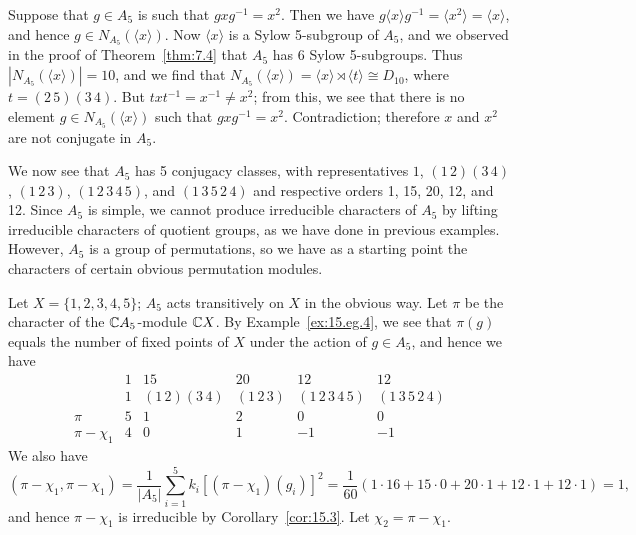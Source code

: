 \documentclass[../Odyssey_Project.tex]{subfiles}
\begin{document}
\begin{example}
Suppose that $g \in A_5$ is such that $gxg^{-1} = x^2$. Then we have $g\langle x \rangle g^{-1} = \langle x^2 \rangle = \langle x \rangle$, and hence $g \in N_{A_5}(\langle x \rangle)$. Now $\langle x \rangle$ is a Sylow 5-subgroup of $A_5$, and we observed in the proof of Theorem~\ref{thm:7.4} that $A_5$ has 6 Sylow 5-subgroups. Thus $|N_{A_5}(\langle x \rangle)| = 10$, and we find that $N_{A_5}(\langle x \rangle) = \langle x \rangle \rtimes \langle t \rangle \cong D_{10}$, where $t = (2\,5)(3\,4)$. But $txt^{-1} = x^{-1} \neq x^2$; from this, we see that there is no element $g \in N_{A_5}(\langle x \rangle)$ such that $gxg^{-1} = x^2$. Contradiction; therefore $x$ and $x^2$ are not conjugate in $A_5$.

We now see that $A_5$ has 5 conjugacy classes, with representatives $1$, $(1\,2)(3\,4)$, $(1\,2\,3)$, $(1\,2\,3\,4\,5)$, and $(1\,3\,5\,2\,4)$ and respective orders 1, 15, 20, 12, and 12. Since $A_5$ is simple, we cannot produce irreducible characters of $A_5$ by lifting irreducible characters of quotient groups, as we have done in previous examples. However, $A_5$ is a group of permutations, so we have as a starting point the characters of certain obvious permutation modules.

Let $X = \{1, 2, 3, 4, 5\}$; $A_5$ acts transitively on $X$ in the obvious way. Let $\pi$ be the character of the $\mathbb{C} A_5$-module $\mathbb{C} X$. By Example~\ref{ex:15.eg.4}, we see that $\pi(g)$ equals the number of fixed points of $X$ under the action of $g \in A_5$, and hence we have
\[
    \begin{array}{c|ccccc}
        & 1 & 15 & 20 & 12 & 12 \\
        & 1 & (1\,2)(3\,4) & (1\,2\,3) & (1\,2\,3\,4\,5) & (1\,3\,5\,2\,4) \\
        \hline
        \pi & 5 & 1 & 2 & 0 & 0 \\
        \pi - \chi_1 & 4 & 0 & 1 & -1 & -1
    \end{array}
\]
We also have
\[
    (\pi - \chi_1, \pi - \chi_1) = \frac{1}{|A_5|}\sum_{i=1}^{5} k_i[(\pi - \chi_1)(g_i)]^2 = \frac{1}{60}(1 \cdot 16 + 15 \cdot 0 + 20 \cdot 1 + 12 \cdot 1 + 12 \cdot 1) = 1,
\]
and hence $\pi - \chi_1$ is irreducible by Corollary~\ref{cor:15.3}. Let $\chi_2 = \pi - \chi_1$.


\end{example}
\end{document}
